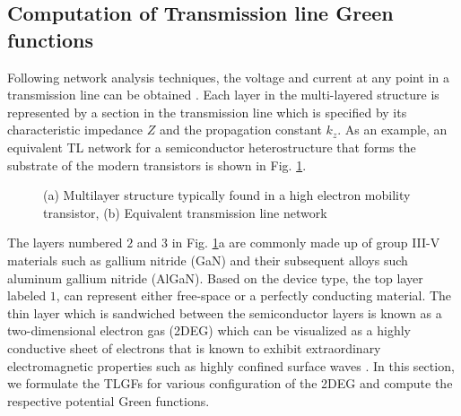 \documentclass[12pt]{article}
\begin{document}
\subsection{Computation of Transmission line Green functions}
%
Following network analysis techniques, the voltage and current at any point in a transmission line can be obtained \cite{Felsen1994}. Each layer in the multi-layered structure is represented by a section in the transmission line which is specified by its characteristic impedance $Z$ and the propagation constant $k_z$. As an example, an equivalent TL network for a semiconductor heterostructure that forms the substrate of the modern transistors is shown in Fig. \ref{fig:TL_equivalent}.
%
\begin{figure}[t!]
  \centering
  \def\svgwidth{\linewidth}
  
  \caption{(a) Multilayer structure typically found in a high electron mobility transistor, (b) Equivalent transmission line network}
  \label{fig:TL_equivalent}
\end{figure}
%
The layers numbered $2$ and $3$ in Fig. \ref{fig:TL_equivalent}a are commonly made up of group III-V materials such as gallium nitride (GaN) and their subsequent alloys such aluminum gallium nitride (AlGaN). Based on the device type, the top layer labeled $1$, can represent either free-space or a perfectly conducting material. The thin layer which is sandwiched between the semiconductor layers is known as a two-dimensional electron gas (2DEG) which can be visualized as a highly conductive sheet of electrons that is known to exhibit extraordinary electromagnetic properties such as highly confined surface waves \cite{Stern1967,Allen1977}. In this section, we formulate the TLGFs for various configuration of the 2DEG and compute the respective potential Green functions.
\end{document}
